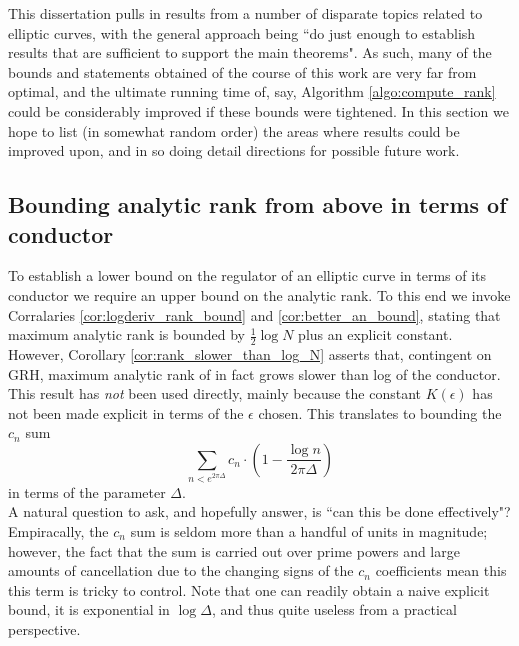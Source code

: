 
This dissertation pulls in results from a number of disparate topics related to elliptic curves, with the general approach being ``do just enough to establish results that are sufficient to support the main theorems". As such, many of the bounds and statements obtained of the course of this work are very far from optimal, and the ultimate running time of, say, Algorithm \ref{algo:compute_rank} could be considerably improved if these bounds were tightened. In this section we hope to list (in somewhat random order) the areas where results could be improved upon, and in so doing detail directions for possible future work.

\subsection{Bounding analytic rank from above in terms of conductor}

To establish a lower bound on the regulator of an elliptic curve in terms of its conductor we require an upper bound on the analytic rank. To this end we invoke Corralaries \ref{cor:logderiv_rank_bound} and \ref{cor:better_an_bound}, stating that maximum analytic rank is bounded by $\frac{1}{2}\log N$ plus an explicit constant. \\

However, Corollary \ref{cor:rank_slower_than_log_N} asserts that, contingent on GRH, maximum analytic rank of in fact grows slower than log of the conductor. This result has {\it not} been used directly, mainly because the constant $K(\epsilon)$ has not been made explicit in terms of the $\epsilon$ chosen. This translates to bounding the $c_n$ sum
\begin{equation}
\sum_{n < e^{2\pi \Delta}} c_n \cdot \left(1-\frac{\log n}{2\pi \Delta}\right)
\end{equation}
in terms of the parameter $\Delta$. \\

A natural question to ask, and hopefully answer, is ``can this be done effectively"? Empiracally, the $c_n$ sum is seldom more than a handful of units in magnitude; however, the fact that the sum is carried out over prime powers and large amounts of cancellation due to the changing signs of the $c_n$ coefficients mean this this term is tricky to control. Note that one can readily obtain a naive explicit bound, it is exponential in $\log \Delta$, and thus quite useless from a practical perspective. \\

